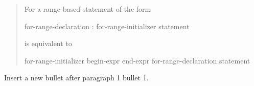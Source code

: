 \begin{quote}
\setcounter{Paras}{0}
\pnum
For a range-based  statement of the form

\begin{ncbnf}
    \terminal{(} for-range-declaration : for-range-initializer \terminal{)} statement
\end{ncbnf}

%
%
%
%
is equivalent to


\begin{ncbnftab}
\terminal{\{}\br
\> for-range-initializer \terminal{;}\br
\>  begin-expr \terminal{;}\br
\> end-expr \terminal{;}\br
\>\br
\>\>for-range-declaration \br
\>\>statement\br
\>\terminal{\}}\br
\terminal{\}}
\end{ncbnftab}
\end{quote}

Insert a new bullet after paragraph 1 bullet 1.

